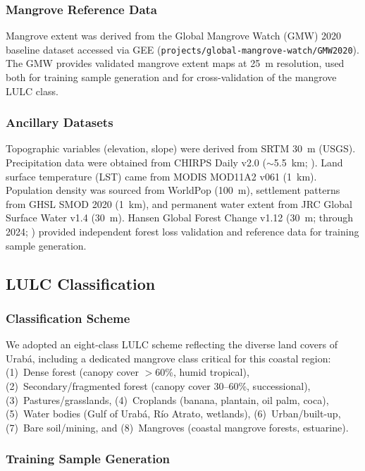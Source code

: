 \documentclass[12pt,a4paper]{article}
\begin{document}
\subsubsection{Mangrove Reference Data}

Mangrove extent was derived from the Global Mangrove Watch (GMW) 2020 baseline dataset \citep{BlancoLibreros2015,Polidoro2010} accessed via GEE (\texttt{projects/global-mangrove-watch/GMW2020}). The GMW provides validated mangrove extent maps at 25~m resolution, used both for training sample generation and for cross-validation of the mangrove LULC class.

\subsubsection{Ancillary Datasets}

Topographic variables (elevation, slope) were derived from SRTM 30~m (USGS). Precipitation data were obtained from CHIRPS Daily v2.0 (${\sim}$5.5~km; \citealp{Funk2015}). Land surface temperature (LST) came from MODIS MOD11A2 v061 (1~km). Population density was sourced from WorldPop (100~m), settlement patterns from GHSL SMOD 2020 (1~km), and permanent water extent from JRC Global Surface Water v1.4 (30~m). Hansen Global Forest Change v1.12 (30~m; through 2024; \citealp{Hansen2013}) provided independent forest loss validation and reference data for training sample generation.

\subsection{LULC Classification}

\subsubsection{Classification Scheme}

We adopted an eight-class LULC scheme reflecting the diverse land covers of Urab\'{a}, including a dedicated mangrove class critical for this coastal region: (1)~Dense forest (canopy cover $>$60\%, humid tropical), (2)~Secondary/fragmented forest (canopy cover 30--60\%, successional), (3)~Pastures/grasslands, (4)~Croplands (banana, plantain, oil palm, coca), (5)~Water bodies (Gulf of Urab\'{a}, R\'{i}o Atrato, wetlands), (6)~Urban/built-up, (7)~Bare soil/mining, and (8)~Mangroves (coastal mangrove forests, estuarine).

\subsubsection{Training Sample Generation}
\end{document}
